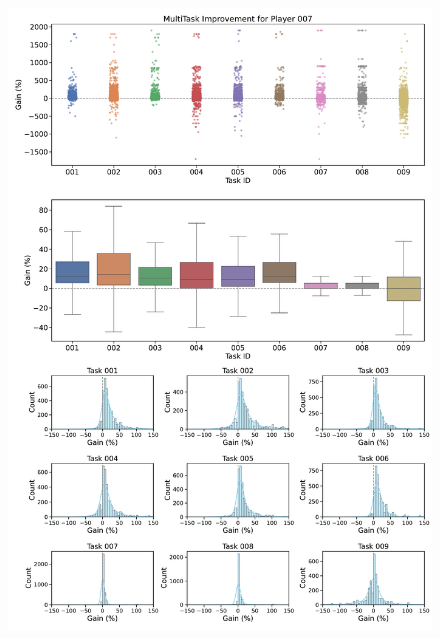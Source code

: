 \begin{figure}[ht]
  \centering
  \includegraphics[width=\textwidth]{figures/gain_validity/multitask/multitask_gain_player_00007.pdf}
\end{figure}
\clearpage

